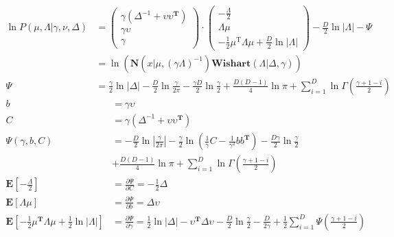 \documentclass{article}
\begin{document}
$$
\begin{aligned}
\ln P(\mu,\Lambda | \gamma, \nu, \Delta) &= 
\left(
    \begin{aligned}
        \gamma(\Delta^{-1} + \upsilon\upsilon^\textbf{T})\\
        \gamma \upsilon\\
        \gamma
    \end{aligned}
\right)
\cdot
\left(
    \begin{aligned}
        - \frac{\Lambda}{2}\\
        \Lambda \mu\\
        -\frac{1}{2}\mu ^ \mathrm{T} \Lambda\mu + \frac{D}{2} \ln |\Lambda|
    \end{aligned}
\right) -\frac{D}{2}\ln|\Lambda| - \Psi\\
    &= \ln(\textbf{N}(x|\mu, (\gamma\Lambda)^{-1})\textbf{Wishart}(\Lambda|\Delta,\gamma))\\
\Psi &= \frac{\gamma}{2}\ln|\Delta|-\frac{D}{2}\ln\frac{\gamma}{2\pi} - \frac{\gamma D}{2}\ln\frac{\gamma}{2} 
    + \frac{D(D-1)}{4}\ln\pi + \sum_{i=1}^{D}\ln\Gamma(\frac{\gamma+1-i}{2})
\end{aligned}
$$
$$
\begin{aligned}
b 
    &= \gamma\upsilon\\
C 
    &= \gamma(\Delta^{-1}+\upsilon\upsilon^\textbf{T})\\
\Psi(\gamma, b, C) 
    &= -\frac{D}{2}\ln|\frac{\gamma}{2\pi}| - \frac{\gamma}{2}\ln(\frac{1}{\gamma}C-\frac{1}{\gamma^2}bb^\textbf{T}) - \frac{D\gamma}{2}\ln\frac{\gamma}{2}\\
    &+\frac{D(D-1)}{4}\ln\pi + \sum_{i=1}^{D}\ln\Gamma(\frac{\gamma+1-i}{2})\\
\textbf{E}[-\frac{\Lambda}{2}]
    &= \frac{\partial\Psi}{\partial C} = -\frac{1}{2}\Delta\\
\textbf{E}[\Lambda\mu]
    &= \frac{\partial\Psi}{\partial b} = \Delta\upsilon\\
\textbf{E}[-\frac{1}{2}\mu^\textbf{T}\Lambda\mu+\frac{1}{2}\ln|\Lambda|]
    &= \frac{\partial\Psi}{\partial \gamma} = \frac{1}{2}\ln|\Delta| -\upsilon^\textbf{T}\Delta\upsilon-\frac{D}{2}\ln\frac{\gamma}{2}-\frac{D}{2\gamma}+\frac{1}{2}\sum^D_{i=1}\Psi(\frac{\gamma+1-i}{2})  \\
\end{aligned}
$$
\end{document}
